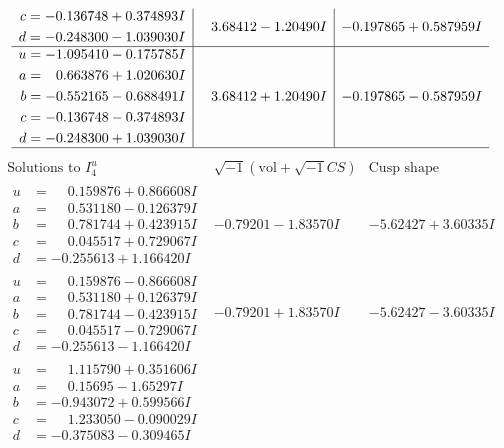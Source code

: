 \documentclass[1p]{elsarticle_modified}
\theoremstyle{definition}
\newcommand{\I}{\sqrt{-1}}
\begin{document}
$$\begin{array}{c|c|c}
\begin{aligned}
c &= -0.136748 + 0.374893 I \\
d &= -0.248300 - 1.039030 I\end{aligned}
 & \phantom{-}3.68412 - 1.20490 I & -0.197865 + 0.587959 I \\ \hline\begin{aligned}
u &= -1.095410 - 0.175785 I \\
a &= \phantom{-}0.663876 + 1.020630 I \\
b &= -0.552165 - 0.688491 I \\
c &= -0.136748 - 0.374893 I \\
d &= -0.248300 + 1.039030 I\end{aligned}
 & \phantom{-}3.68412 + 1.20490 I & -0.197865 - 0.587959 I\\
 \hline 
 \end{array}$$\newpage$$\begin{array}{c|c|c}  
\text{Solutions to }I^u_{4}& \I (\text{vol} + \sqrt{-1}CS) & \text{Cusp shape}\\
 \hline 
\begin{aligned}
u &= \phantom{-}0.159876 + 0.866608 I \\
a &= \phantom{-}0.531180 - 0.126379 I \\
b &= \phantom{-}0.781744 + 0.423915 I \\
c &= \phantom{-}0.045517 + 0.729067 I \\
d &= -0.255613 + 1.166420 I\end{aligned}
 & -0.79201 - 1.83570 I & -5.62427 + 3.60335 I \\ \hline\begin{aligned}
u &= \phantom{-}0.159876 - 0.866608 I \\
a &= \phantom{-}0.531180 + 0.126379 I \\
b &= \phantom{-}0.781744 - 0.423915 I \\
c &= \phantom{-}0.045517 - 0.729067 I \\
d &= -0.255613 - 1.166420 I\end{aligned}
 & -0.79201 + 1.83570 I & -5.62427 - 3.60335 I \\ \hline\begin{aligned}
u &= \phantom{-}1.115790 + 0.351606 I \\
a &= \phantom{-}0.15695 - 1.65297 I \\
b &= -0.943072 + 0.599566 I \\
c &= \phantom{-}1.233050 - 0.090029 I \\
d &= -0.375083 - 0.309465 I\end{aligned}

\end{array}$$
\end{document}
